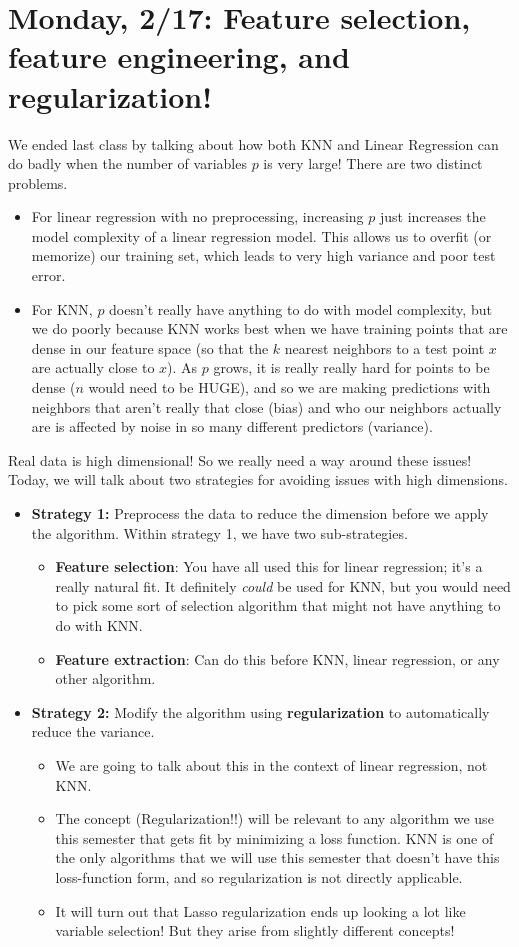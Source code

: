 \section{Monday, 2/17: Feature selection, feature engineering, and regularization!}

We ended last class by talking about how both KNN and Linear Regression can do badly when the number of variables $p$ is very large! There are two distinct problems.
\begin{itemize}
\item For linear regression with no preprocessing, increasing $p$ just increases the model complexity of a linear regression model. This allows us to overfit (or memorize) our training set, which leads to very high variance and poor test error. 
\item For KNN, $p$ doesn't really have anything to do with model complexity, but we do poorly because KNN works best when we have training points that are dense in our feature space (so that the $k$ nearest neighbors to a test point $x$ are actually close to $x$). As $p$ grows, it is really really hard for points to be dense ($n$ would need to be HUGE), and so we are making predictions with neighbors that aren't really that close (bias) and who our neighbors actually are is affected by noise in so many different predictors (variance). 
\end{itemize}
Real data is high dimensional! So we really need a way around these issues! Today, we will talk about two strategies for avoiding issues with high dimensions.
\begin{itemize}
\item \textbf{Strategy 1: }	Preprocess the data to reduce the dimension before we apply the algorithm. Within strategy 1, we have two sub-strategies. 
\begin{itemize}
\item \textbf{Feature selection}: You have all used this for linear regression; it's a really natural fit. It definitely \emph{could} be used for KNN, but you would need to pick some sort of selection algorithm that might not have anything to do with KNN. 
\item \textbf{Feature extraction}: Can do this before KNN, linear regression, or any other algorithm. 
\end{itemize}
\item \textbf{Strategy 2: }	Modify the algorithm using \textbf{regularization} to automatically reduce the variance.
\begin{itemize}
\item We are going to talk about this in the context of linear regression, not KNN.
\item The concept (Regularization!!) will be relevant to any algorithm we use this semester that gets fit by minimizing a loss function. KNN is one of the only algorithms that we will use this semester that doesn't have this loss-function form, and so regularization is not directly applicable. 
\item It will turn out that Lasso regularization ends up looking a lot like variable selection! But they arise from slightly different concepts!
\end{itemize}
\end{itemize}

